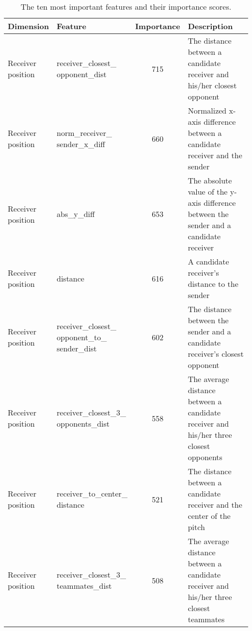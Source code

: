 \begin{table}[!t]
\caption{The ten most important features and their importance scores.}
\centering
\renewcommand{\tabcolsep}{3pt}
\resizebox{1.0\textwidth}{!} {
\begin{threeparttable}
\begin{tabular}{llcp{6cm}}
  \toprule
  Dimension & Feature & Importance & Description \\
  \midrule
  \specialcell{Receiver\\position\tnote{1}} & \specialcell{receiver\_closest\_\\opponent\_dist} & 715 &  The distance between a candidate receiver and his/her closest opponent \\
  \specialcell{Receiver\\position} & \specialcell{norm\_receiver\_\\sender\_x\_diff} & 660 & Normalized x-axis difference between a candidate receiver and the sender \\
  \specialcell{Receiver\\position} & abs\_y\_diff & 653 & The absolute value of the y-axis difference between the sender and a candidate receiver \\
  \specialcell{Receiver\\position} & distance & 616 & A candidate receiver's distance to the sender \\
  \specialcell{Receiver\\position} & \specialcell{receiver\_closest\_\\opponent\_to\_\\sender\_dist} & 602 & The distance between the sender and a candidate receiver's closest opponent \\
  \specialcell{Receiver\\position} & \specialcell{receiver\_closest\_3\_\\opponents\_dist} & 558 & The average distance between a candidate receiver and his/her three closest opponents \\
  \specialcell{Receiver\\position} & \specialcell{receiver\_to\_center\_\\distance} & 521 & The distance between a candidate receiver and the center of the pitch \\
  \specialcell{Receiver\\position} & \specialcell{receiver\_closest\_3\_\\teammates\_dist} & 508 & The average distance between a candidate receiver and his/her three closest teammates \\

\end{tabular}
\end{threeparttable}}
\end{table}
